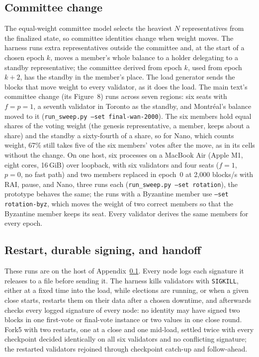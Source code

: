 \documentclass[conference]{IEEEtran}
\begin{document}
\subsection{Committee change}
\label{app:rotation}
The equal-weight committee model selects the heaviest $N$ representatives from the finalized state, so committee identities change when weight moves. The harness runs extra representatives outside the committee and, at the start of a chosen epoch $k$, moves a member's whole balance to a holder delegating to a standby representative; the committee derived from epoch $k$, used from epoch $k+2$, has the standby in the member's place. The load generator sends the blocks that move weight to every validator, as it does the load. The main text's committee change (its Figure~8) runs across seven regions: six seats with $f=p=1$, a seventh validator in Toronto as the standby, and Montr\'eal's balance moved to it (\texttt{run\_sweep.py --set final-wan-2000}). The six members hold equal shares of the voting weight (the genesis representative, a member, keeps about a share) and the standby a sixty-fourth of a share, so for Nano, which counts weight, 67\% still takes five of the six members' votes after the move, as in its cells without the change. On one host, six processes on a MacBook Air (Apple M1, eight cores, 16\,GiB) over loopback, with six validators and four seats ($f=1$, $p=0$, no fast path) and two members replaced in epoch~0 at 2{,}000 blocks/s with RAI, pause, and Nano, three runs each (\texttt{run\_sweep.py --set rotation}), the prototype behaves the same; the runs with a Byzantine member use \texttt{--set rotation-byz}, which moves the weight of two correct members so that the Byzantine member keeps its seat. Every validator derives the same members for every epoch.

\subsection{Restart, durable signing, and handoff}
\label{app:restart}
These runs are on the host of Appendix~\ref{app:rotation}. Every node logs each signature it releases to a file before sending it. The harness kills validators with \texttt{SIGKILL}, either at a fixed time into the load, while elections are running, or when a given close starts, restarts them on their data after a chosen downtime, and afterwards checks every logged signature of every node: no identity may have signed two blocks in one first-vote or final-vote instance or two values in one close round. Fork5 with two restarts, one at a close and one mid-load, settled twice with every checkpoint decided identically on all six validators and no conflicting signature; the restarted validators rejoined through checkpoint catch-up and follow-ahead.
\end{document}

